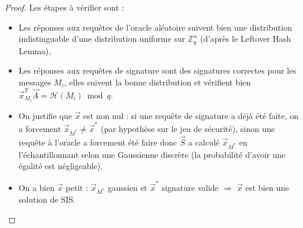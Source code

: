 \begin{proof}
Les étapes à vérifier sont :
\begin{itemize}
\item Les réponses aux requêtes de l'oracle aléatoire suivent bien une distribution indistinguable d'une distribution uniforme sur $\mathbb{Z}_q^n$ (d'après le Leftover Hash Lemma),
\item Les réponses aux requêtes de signature sont des signatures correctes pour les messages $M_i$, elles suivent la bonne distribution et vérifient bien $\vec{x}_{M_i}^T \vec{A} = \mathcal{H}(M_i) \bmod q$.
\item On justifie que $\vec{x}$ est non nul : si une requête de signature a déjà été faite, on a forcement $\vec{x}_{M^*} \neq \vec{x}^*$ (par hypothèse sur le jeu de sécurité), sinon une requête à l'oracle a forcement été faire donc $\vec{S}$ a calculé $\vec{x}_{M^*}$ en l'échantillonnant selon une Gaussienne discrète (la probabilité d'avoir une égalité est négligeable).
\item On a bien $\vec{x}$ petit : $\vec{x}_{M^*}$ gaussien et $\vec{x}^*$ signature valide $\Rightarrow$ $\vec{x}$ est bien une solution de SIS.
\end{itemize}


\end{proof}
